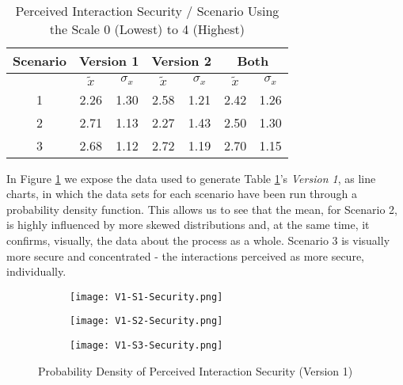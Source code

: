 \begin{table}[htb]
	\centering
	\caption{Perceived Interaction Security / Scenario Using the Scale 0 (Lowest) to 4 (Highest)}
	\label{tab: perceivedInteractionSecurity}
	\begin{tabular}{c|cc|cc|cc}
		\hline
		Scenario & \multicolumn{2}{c}{\bf Version 1} \vrule & \multicolumn{2}{c}{\bf Version 2} \vrule & \multicolumn{2}{c}{\bf Both}                                             \\
		\hline
		         & $\tilde{x}$                       & $\sigma_{x}$                             & $\tilde{x}$                  & $\sigma_{x}$ & $\tilde{x}$ & $\sigma_{x}$ \\
		\hline
		1        & 2.26                              & 1.30                                     & 2.58                         & 1.21         & 2.42        & 1.26         \\
		\hline
		2        & 2.71                              & 1.13                                     & 2.27                         & 1.43         & 2.50        & 1.30         \\
		\hline
		3        & 2.68                              & 1.12                                     & 2.72                         & 1.19         & 2.70        & 1.15         \\
		\hline
	\end{tabular}
\end{table}

In Figure \ref{fig: perceivedInteractionSecurityOne} we expose the data used to generate Table \ref{tab: perceivedInteractionSecurity}'s \textit{Version 1}, as line charts, in which the data sets for each scenario have been run through a probability density function. This allows us to see that the mean, for Scenario 2, is highly influenced by more skewed distributions and, at the same time, it confirms, visually, the data about the process as a whole. Scenario 3 is visually more secure and concentrated - the interactions perceived as more secure, individually.

\begin{figure}[htb]
	\centering
	\begin{subfigure}[b]{0.49\textwidth}
		\centering
		\texttt{[image: V1-S1-Security.png]}
	\end{subfigure}
	\begin{subfigure}[b]{0.49\textwidth}
		\centering
		\texttt{[image: V1-S2-Security.png]}
	\end{subfigure}
	\hfill
	\begin{subfigure}[b]{0.49\textwidth}
		\centering
		\texttt{[image: V1-S3-Security.png]}
	\end{subfigure}

	\caption{Probability Density of Perceived Interaction Security (Version 1)}
	\label{fig: perceivedInteractionSecurityOne}
\end{figure}

